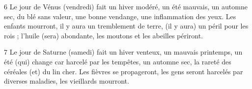 \par 6 Le jour de Vénus (vendredi) fait un hiver modéré, un été mauvais, un automne sec, du blé sans valeur, une bonne vendange, une inflammation des yeux. Les enfants mourront, il y aura un tremblement de terre, (il y aura) un péril pour les rois ; l'huile (sera) abondante, les moutons et les abeilles périront.

\par 7 Le jour de Saturne (samedi) fait un hiver venteux, un mauvais printemps, un été (qui) change car harcelé par les tempêtes, un automne sec, la rareté des céréales (et) du lin cher. Les fièvres se propageront, les gens seront harcelés par diverses maladies, les vieillards mourront.


